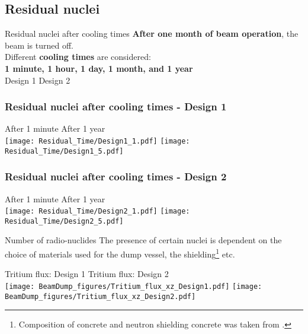 \documentclass[xcolor={dvipsnames}]{beamer}
\begin{document}
\subsection{Residual nuclei}
\begin{frame}{Residual nuclei after cooling times}
\textbf{After one month of beam operation}, the beam is turned off.\\
Different \textbf{cooling times} are considered:\\
\textbf{1 minute, 1 hour, 1 day, 1 month, and 1 year}\\
\vspace*{0.3cm}
\hspace*{1.8cm} Design 1 \hfill Design 2 \hspace*{2.3cm} \\
  \begin{center}
  \end{center}
\end{frame}
\begin{frame}
  \frametitle{Residual nuclei after cooling times - \textbf{Design 1}}
  \begin{center}
    \hspace*{1.6cm} After 1 minute \hfill After 1 year \hspace*{2.1cm} \\
  \texttt{[image: Residual\_Time/Design1\_1.pdf]}
  \texttt{[image: Residual\_Time/Design1\_5.pdf]}
 \end{center}
\end{frame}
\begin{frame}
  \frametitle{Residual nuclei after cooling times - Design 2}
  \begin{center}
    \hspace*{1.6cm} After 1 minute \hfill After 1 year \hspace*{2.1cm} \\
  \texttt{[image: Residual\_Time/Design2\_1.pdf]}
  \texttt{[image: Residual\_Time/Design2\_5.pdf]}
 \end{center}
\end{frame}

\begin{frame}{Number of radio-nuclides}
The presence of certain nuclei is dependent on the choice of materials used for the dump vessel, the shielding\footnote{Composition of concrete and neutron shielding concrete was taken from \cite{Concrete}.} etc.
\begin{center}
\hspace*{1cm} Tritium flux: Design 1 \hfill Tritium flux: Design 2 \hspace*{1cm} \\
  \texttt{[image: BeamDump\_figures/Tritium\_flux\_xz\_Design1.pdf]}
    \texttt{[image: BeamDump\_figures/Tritium\_flux\_xz\_Design2.pdf]}
 \end{center}
\end{frame}
\end{document}

